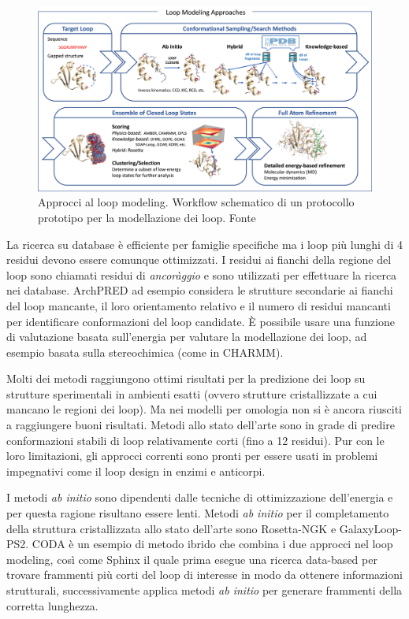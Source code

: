 {{\begin{figure}[!htb]
	\centering
	\includegraphics[scale=1]{images/loop-modeling-approaches.jpg}
	\caption{Approcci al loop modeling. Workflow schematico di un protocollo prototipo per la modellazione dei loop. Fonte\cite{barozet2021current}}
	\label{fig:loop-modeling-approaches}
\end{figure}

La ricerca su database è efficiente per famiglie specifiche ma i loop più lunghi di 4 residui devono essere comunque ottimizzati. I residui ai fianchi della regione del loop sono chiamati residui di \textit{ancoràggio} e sono utilizzati per effettuare la ricerca nei database. ArchPRED ad esempio considera le strutture secondarie ai fianchi del loop mancante, il loro orientamento relativo e il numero di residui mancanti per identificare conformazioni del loop candidate. È possibile usare una funzione di valutazione basata sull'energia per valutare la modellazione dei loop, ad esempio basata sulla stereochimica (come in CHARMM). 

\par Molti dei metodi raggiungono ottimi risultati per la predizione dei loop su strutture sperimentali in ambienti esatti (ovvero strutture cristallizzate a cui mancano le regioni dei loop). Ma nei modelli per omologia non si è ancora riusciti a raggiungere buoni risultati\supercite{karami2018dareus}. Metodi allo stato dell'arte sono in grade di predire conformazioni stabili di loop relativamente corti (fino a 12 residui)\supercite{barozet2021current}.
Pur con le loro limitazioni, gli approcci correnti sono pronti per essere usati in problemi impegnativi come il loop design in enzimi e anticorpi.

\par I metodi \textit{ab initio} sono dipendenti dalle tecniche di ottimizzazione dell'energia e per questa ragione risultano essere lenti. Metodi \textit{ab initio} per il completamento della struttura cristallizzata allo stato dell'arte sono Rosetta-NGK e GalaxyLoop-PS2. CODA è un esempio di metodo ibrido che combina i due approcci nel loop modeling, così come Sphinx il quale prima esegue una ricerca data-based per trovare frammenti più corti del loop di interesse in modo da ottenere informazioni strutturali, successivamente applica metodi \textit{ab initio} per generare frammenti della corretta lunghezza. \\

}}
